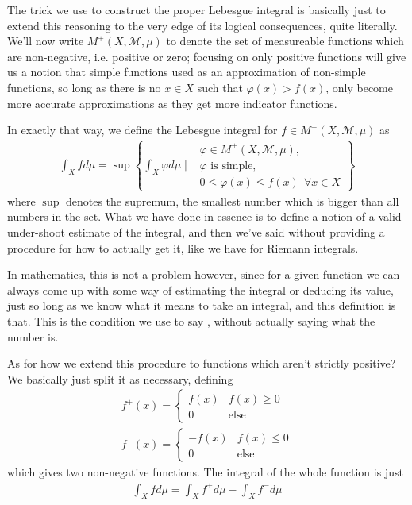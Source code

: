 \documentclass[11pt]{article}
\begin{document}
The trick we use to construct the proper Lebesgue integral is basically just to extend this reasoning to the very edge of its logical consequences, quite literally. We'll now write $M^+(X,\mathcal M, \mu)$ to denote the set of measureable functions which are non-negative, i.e. positive or zero; focusing on only positive functions will give us a notion that simple functions used as an approximation of non-simple functions, so long as there is no $x \in X$ such that $\varphi(x) > f(x)$, only become more accurate approximations as they get more indicator functions.

In exactly that way, we define the Lebesgue integral for $f \in M^+(X,\mathcal M, \mu)$ as \begin{gather*}
\int_X f d\mu = \sup\left\{ \int_X \varphi d\mu \mid \ \  \begin{matrix} \varphi \in M^+(X,\mathcal M, \mu), \\ \varphi\text{ is simple,} \\ 0 \le \varphi(x) \le f(x) \ \ \forall x\in X \end{matrix} \right\} 
\end{gather*}
where $\sup$ denotes the supremum, the smallest number which is bigger than all numbers in the set. What we have done in essence is to define a notion of a valid under-shoot estimate of the integral, and then we've said  without providing a procedure for how to actually get it, like we have for Riemann integrals.

In mathematics, this is not a problem however, since for a given function we can always come up with some way of estimating the integral or deducing its value, just so long as we know what it means to take an integral, and this definition is that. This is the condition we use to say , without actually saying what the number is.

As for how we extend this procedure to functions which aren't strictly positive? We basically just split it as necessary, defining \begin{gather*}
f^+ (x) = \left\{ \begin{matrix} f(x) & f(x) \ge 0 \\ 0 & \text{else} \end{matrix} \right. \\
f^- (x) = \left\{ \begin{matrix} - f(x) & f(x) \le 0 \\ 0 & \text{else} \end{matrix} \right.
\end{gather*}
which gives two non-negative functions. The integral of the whole function is just \begin{gather*}
\int_X f d\mu = \int_X f^+ d\mu - \int_X f^- d\mu
\end{gather*}
\end{document}
